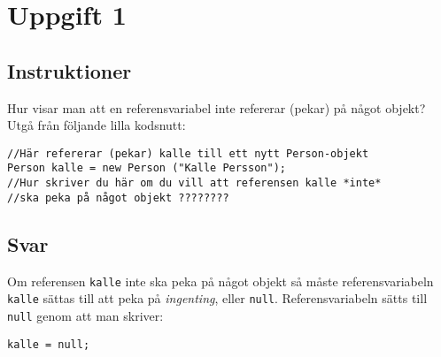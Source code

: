 \section{Uppgift 1}\label{sec:uppg01}

\subsection{Instruktioner}
Hur visar man att en referensvariabel inte refererar (pekar) på något objekt?
Utgå från följande lilla kodsnutt:

\begin{Verbatim}[fontsize=\small]
//Här refererar (pekar) kalle till ett nytt Person-objekt
Person kalle = new Person ("Kalle Persson");
//Hur skriver du här om du vill att referensen kalle *inte*
//ska peka på något objekt ????????
\end{Verbatim}


\subsection{Svar}
Om referensen \texttt{kalle} inte ska peka på något objekt så måste
referensvariabeln \texttt{kalle} sättas till att peka på \emph{ingenting},
eller \texttt{null}.  Referensvariabeln sätts till \texttt{null} genom att man
skriver:
\begin{verbatim}kalle = null;\end{verbatim}

